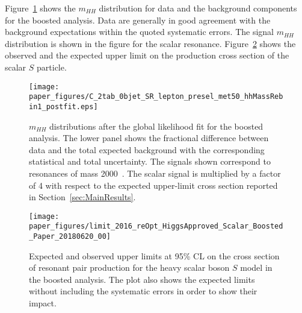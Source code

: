 Figure~\ref{fig:boosted_postfit_mhh} shows the $m_{HH}$ distribution for
data and the background components for the boosted analysis.
Data are generally in good agreement with the background expectations within the quoted systematic errors.
The signal $m_{HH}$ distribution is shown in the figure for  the scalar resonance.
Figure~\ref{fig:boosted_only_limits} shows the observed and the expected
upper limit on the production cross section of the scalar $S$ particle.
\iffalse
The expected
sensitivity of the boosted analysis is better than the resolved one
for the mass of the resonance X ($X = S, G^{\ast}_{\rm KK}$)   $m_X> 1300$~\GeV\.
\fi
\begin{figure}
\begin{center}
\texttt{[image: paper\_figures/C\_2tab\_0bjet\_SR\_lepton\_presel\_met50\_hhMassRebin1\_postfit.eps]}
 
\end{center}
\caption{$m_{HH}$ distributions after the global likelihood fit for the boosted analysis. The lower panel shows the fractional difference between data and the total expected background with the corresponding statistical and total uncertainty.  The signals shown correspond to resonances of mass 2000~\gev. The scalar signal is multiplied by a factor of 4 with respect to the expected upper-limit cross section reported in Section~\ref{sec:MainResults}.}
  \label{fig:boosted_postfit_mhh}
\end{figure}
\FloatBarrier
 
\begin{figure}[!h]
\begin{center}
\texttt{[image: paper\_figures/limit\_2016\_reOpt\_HiggsApproved\_Scalar\_Boosted\_Paper\_20180620\_00]}
\caption{Expected and observed upper limits at 95\% CL on the cross section of resonant pair production for the heavy scalar boson $S$ model in the boosted analysis. The plot also shows the expected limits without including the systematic errors in order to show their impact.
          }
 
\label{fig:boosted_only_limits}
\end{center}
\end{figure}